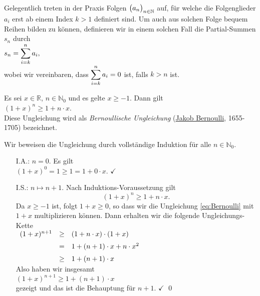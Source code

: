\noindent
Gelegentlich treten in der Praxis Folgen $\bigl(a_n\bigr)_{n\in\mathbb{N}}$ auf, f\"ur welche die Folgenglieder
$a_i$ erst ab einem Index $k>1$ definiert sind.  
Um auch aus solchen Folge bequem Reihen bilden zu k\"onnen, definieren wir in einem solchen
Fall die Partial-Summen $s_n$ durch
\\[0.2cm]
\hspace*{1.3cm}
$\displaystyle s_n = \sum\limits_{i=k}^n a_i, $
\\ 
wobei wir vereinbaren, dass $\displaystyle\sum_{i=k}^n a_i = 0$ ist, falls $k > n$ ist.

\begin{Satz}
Es sei $x \in \mathbb{R}$, $n \in \mathbb{N}_0$ und es gelte $x \geq -1$.   Dann gilt 
\\[0.2cm]
\hspace*{1.3cm}
$(1 + x)^n \geq 1 + n \cdot x$.
\\[0.2cm]
Diese Ungleichung wird als \emph{Bernoullische Ungleichung}
(\href{http://en.wikipedia.org/wiki/Jacob_Bernoulli}{Jakob Bernoulli}, 1655-1705)
bezeichnet.
\end{Satz}

\proof
Wir beweisen die Ungleichung durch vollst\"andige Induktion f\"ur alle $n \in \mathbb{N}_0$.
\begin{enumerate}
\item[I.A.:] $n = 0$.  Es gilt
             \\[0.2cm]
             \hspace*{1.3cm}
             $(1 + x)^0 = 1 \geq 1 = 1 + 0 \cdot x$. \quad  $\checkmark$
\item[I.S.:] $n \mapsto n + 1$.   Nach Induktions-Voraussetzung gilt
             \begin{equation}
               \label{eq:Bernoulli}
             (1 + x)^n \geq 1 + n \cdot x.
             \end{equation}
             Da $x \geq -1$ ist, folgt $1 + x \geq 0$, so dass wir die Ungleichung
             \ref{eq:Bernoulli} mit $1 + x$ multiplizieren k\"onnen.  Dann erhalten wir die 
             folgende Ungleichungs-Kette
             \\[0.2cm]
             \hspace*{1.3cm}
             $
             \begin{array}[t]{lcl}
             (1 + x)^{n+1} & \geq & (1 + n \cdot x) \cdot (1 + x)     \\[0.2cm]
                           & =    & 1 + (n + 1) \cdot x + n \cdot x^2 \\[0.2cm]
                           & \geq & 1 + (n + 1) \cdot x 
             \end{array}
             $
             \\[0.2cm]
             Also haben wir insgesamt
             \\[0.2cm]
             \hspace*{1.3cm}
             $(1 + x)^{n+1} \geq 1 + (n + 1) \cdot x$ 
             \\[0.2cm]
             gezeigt und das ist die Behauptung f\"ur $n+1$. $\checkmark$ \qed
\end{enumerate}

